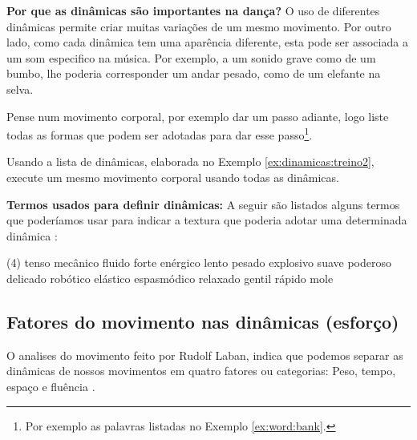 \begin{tcbinformation} 
\label{ref:importanciadinamicas}
\textbf{Por que as dinâmicas são importantes na dança?}
O uso de diferentes dinâmicas permite criar muitas variações de um mesmo movimento.
Por outro lado, como cada dinâmica tem uma aparência diferente,
esta pode ser associada a um som especifico na música.
Por exemplo, a um sonido grave como de um bumbo,
lhe poderia corresponder um andar pesado, como de um elefante  na selva.
\end{tcbinformation} 

\begin{example}
\label{ex:dinamicas:treino1}
Pense num movimento corporal, por exemplo dar um passo adiante,
logo liste todas as formas que podem ser adotadas para dar esse passo\footnote{Por 
exemplo as palavras listadas no Exemplo \ref{ex:word:bank}.}. 
\end{example}

\begin{example}
\label{ex:dinamicas:treino2}
Usando a lista de dinâmicas, elaborada no Exemplo \ref{ex:dinamicas:treino2},
execute um mesmo movimento corporal usando  todas as dinâmicas.
\end{example}

\begin{example}
\label{ex:word:bank}
\textbf{Termos usados para definir dinâmicas:} 
A seguir são listados alguns termos que poderíamos usar 
para indicar a textura que poderia adotar uma determinada dinâmica \cite[pp. 31]{paine2014complete}:

\begin{tasks}(4)
\task tenso
\task mecânico
\task fluido
\task forte
\task enérgico
\task lento
\task pesado
\task explosivo
\task suave
\task poderoso
\task delicado
\task robótico
\task elástico
\task espasmódico
\task relaxado
\task gentil
\task rápido
\task mole
\end{tasks}
\end{example}



\subsection{Fatores do movimento nas dinâmicas (esforço)}
\label{subsec:fatordinamica}
O  analises do movimento feito por Rudolf Laban, 
indica que podemos separar as dinâmicas de nossos movimentos em quatro fatores ou categorias: 
Peso, tempo, espaço e fluência
\cite[pp. 142]{laban1987dominio} 
\cite[pp. 93]{maletic2011body}
\cite[pp. 30]{paine2014complete}
\cite[pp. 5]{carline2011lesson}.


